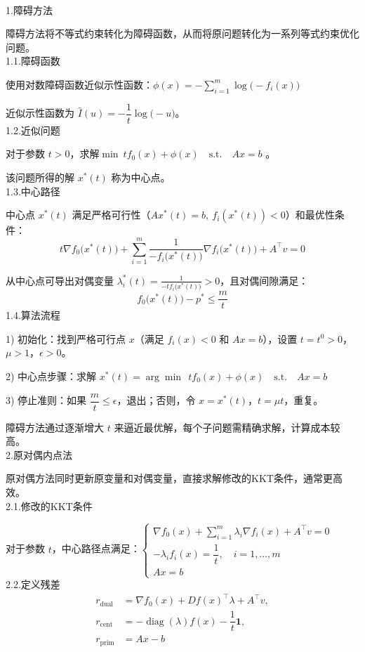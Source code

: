 \documentclass{article}
\newenvironment{solution_cn}{%
  \begin{proof}[解答]%
  \kaishu  %
}{%
  \end{proof}%
}
\begin{document}
\begin{solution_cn} 
\quad \\1.障碍方法

障碍方法将不等式约束转化为障碍函数，从而将原问题转化为一系列等式约束优化问题。\\
1.1.障碍函数

使用对数障碍函数近似示性函数：$ \phi(x) = -\sum_{i=1}^m \log\bigl(-f_i(x)\bigr)$ 

近似示性函数为 \(\hat{I}(u) = -\dfrac{1}{t} \log\bigl(-u\bigr)\)。\\
1.2.近似问题

对于参数 \(t > 0\)，求解$\min\ t f_0(x) + \phi(x) \quad \text{s.t.} \quad A x = b $ 。

该问题所得的解 \(x^*(t)\) 称为中心点。\\
1.3.中心路径

中心点 \(x^*(t)\) 满足严格可行性（\(A x^*(t) = b,\ f_i(x^*(t)) < 0\)）和最优性条件：  
  \[
  t \nabla f_0\bigl(x^*(t)\bigr) + \sum_{i=1}^m \frac{1}{-f_i\bigl(x^*(t)\bigr)} \nabla f_i\bigl(x^*(t)\bigr) + A^\top v = 0
  \]  

从中心点可导出对偶变量 \(\lambda_i^*(t) = \frac{1}{-t f_i\bigl(x^*(t)\bigr)} > 0\)，且对偶间隙满足：  
  \[
  f_0\bigl(x^*(t)\bigr) - p^* \leq \frac{m}{t}
  \]  
1.4.算法流程

1) 初始化：找到严格可行点 \( x \)（满足 \( f_i(x) < 0 \) 和 \( Ax = b \)），设置 \( t = t^0 > 0 \)，\( \mu > 1 \)，\( \epsilon > 0 \)。

2) 中心点步骤：求解 $x^*(t) = \arg\min\ \ t f_0(x) + \phi(x) \quad \text{s.t.} \quad Ax = b$  

3) 停止准则：如果 \( \dfrac{m}{t} \leq \epsilon \)，退出；否则，令 \( x = x^*(t) \)，\( t = \mu t \)，重复。  

障碍方法通过逐渐增大 \( t \) 来逼近最优解，每个子问题需精确求解，计算成本较高。\\
2.原对偶内点法

原对偶方法同时更新原变量和对偶变量，直接求解修改的KKT条件，通常更高效。\\
2.1.修改的KKT条件

对于参数 \( t \)，中心路径点满足：$
\begin{cases}
\nabla f_0(x) + \sum_{i=1}^m \lambda_i \nabla f_i(x) + A^\top v = 0 \\
-\lambda_i f_i(x) = \dfrac{1}{t}, \quad i=1,\dots,m \\
Ax = b
\end{cases}$\\
2.2.定义残差  
\begin{align*}
r_{\text{dual}} &= \nabla f_0(x) + Df(x)^\top \lambda + A^\top v, \\
r_{\text{cent}} &= -\mathop{\text{diag}}(\lambda) f(x) - \dfrac{1}{t} \mathbf{1}, \\
r_{\text{prim}} &= Ax - b
\end{align*}


\end{solution_cn}
\end{document}
